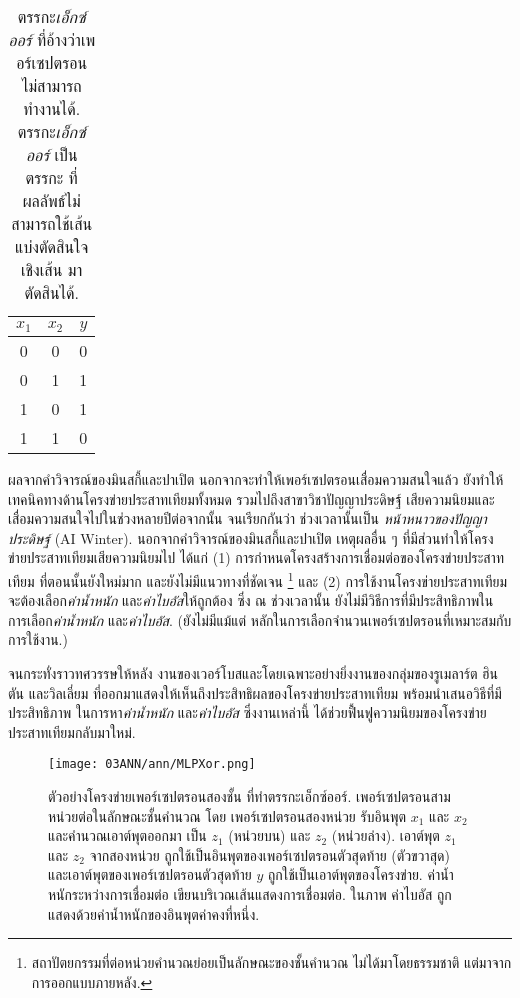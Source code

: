 %
\begin{table}[hbtp]
	\caption[ตรรกะเอ็กซ์ออร์]{ตรรกะ\textit{เอ็กซ์ออร์} ที่อ้างว่าเพอร์เซปตรอน ไม่สามารถทำงานได้. 
	ตรรกะ\textit{เอ็กซ์ออร์} เป็นตรรกะ ที่ผลลัพธ์ไม่สามารถใช้เส้นแบ่งตัดสินใจเชิงเส้น มาตัดสินได้.}
	\begin{center}
		\begin{tabular}{|c|c|c|}
			\hline 
			$x_1$ & $x_2$ & $y$ \\
			\hline
			0     &    0  & 0   \\
			0     &    1  & 1   \\
			1     &    0  & 1   \\
			1     &    1  & 0   \\
			\hline
		\end{tabular} 
	\end{center}
	\label{tbl: ANN XOR}
\end{table}


ผลจากคำวิจารณ์ของมินสกี้และปาเปิต นอกจากจะทำให้เพอร์เซปตรอนเสื่อมความสนใจแล้ว 
ยังทำให้เทคนิคทางด้านโครงข่ายประสาทเทียมทั้งหมด รวมไปถึงสาขาวิชาปัญญาประดิษฐ์ 
เสียความนิยมและเสื่อมความสนใจไปในช่วงหลายปีต่อจากนั้น
จนเรียกกันว่า ช่วงเวลานั้นเป็น \textit{หน้าหนาวของปัญญาประดิษฐ์} (AI Winter).
นอกจากคำวิจารณ์ของมินสกี้และปาเปิต
เหตุผลอื่น ๆ ที่มีส่วนทำให้โครงข่ายประสาทเทียมเสียความนิยมไป
ได้แก่
(1) การกำหนดโครงสร้างการเชื่อมต่อของโครงข่ายประสาทเทียม
ที่ตอนนั้นยังใหม่มาก และยังไม่มีแนวทางที่ชัดเจน%
\footnote{%
สถาปัตยกรรมที่ต่อหน่วยคำนวณย่อยเป็นลักษณะของชั้นคำนวณ ไม่ได้มาโดยธรรมชาติ แต่มาจากการออกแบบภายหลัง.
}
และ (2)
การใช้งานโครงข่ายประสาทเทียม
จะต้องเลือก\textit{ค่าน้ำหนัก}
และ\textit{ค่าไบอัส}ให้ถูกต้อง
ซึ่ง ณ ช่วงเวลานั้น
ยังไม่มีวิธีการที่มีประสิทธิภาพในการเลือก\textit{ค่าน้ำหนัก}
และ\textit{ค่าไบอัส}.
(ยังไม่มีแม้แต่ หลักในการเลือกจำนวนเพอร์เซปตรอนที่เหมาะสมกับการใช้งาน.)

จนกระทั่งราวทศวรรษให้หลัง งานของเวอร์โบส\cite{Werbos1974a}และโดยเฉพาะอย่างยิ่งงานของกลุ่มของรูเมลาร์ต ฮินตัน และวิลเลี่ยม\cite{RumelhartEtAl1986a} ที่ออกมาแสดงให้เห็นถึงประสิทธิผลของโครงข่ายประสาทเทียม 
พร้อมนำเสนอวิธีที่มีประสิทธิภาพ ในการหา\textit{ค่าน้ำหนัก}
และ\textit{ค่าไบอัส}
ซึ่งงานเหล่านี้ ได้ช่วยฟื้นฟูความนิยมของโครงข่ายประสาทเทียมกลับมาใหม่.

%
\begin{figure}
	\begin{center}
		\texttt{[image: 03ANN/ann/MLPXor.png]}
	\end{center}
	\caption[ตัวอย่างโครงข่ายเพอร์เซปตรอนสองชั้น]{ตัวอย่างโครงข่ายเพอร์เซปตรอนสองชั้น ที่ทำตรรกะเอ็กซ์ออร์. 
		เพอร์เซปตรอนสามหน่วยต่อในลักษณะชั้นคำนวณ โดย
		เพอร์เซปตรอนสองหน่วย รับอินพุต $x_1$ และ $x_2$
		และคำนวณเอาต์พุตออกมา เป็น $z_1$ (หน่วยบน) และ $z_2$ (หน่วยล่าง).
		เอาต์พุต $z_1$ และ $z_2$ จากสองหน่วย ถูกใช้เป็นอินพุตของเพอร์เซปตรอนตัวสุดท้าย (ตัวขวาสุด) 
		และเอาต์พุตของเพอร์เซปตรอนตัวสุดท้าย $y$ ถูกใช้เป็นเอาต์พุตของโครงข่าย.	
		ค่าน้ำหนักระหว่างการเชื่อมต่อ เขียนบริเวณเส้นแสดงการเชื่อมต่อ. 
		ในภาพ ค่า{ไบอัส} ถูกแสดงด้วยค่าน้ำหนักของอินพุตค่าคงที่หนึ่ง.}
	\label{fig: ANN MLP for XOR}
\end{figure}
%


